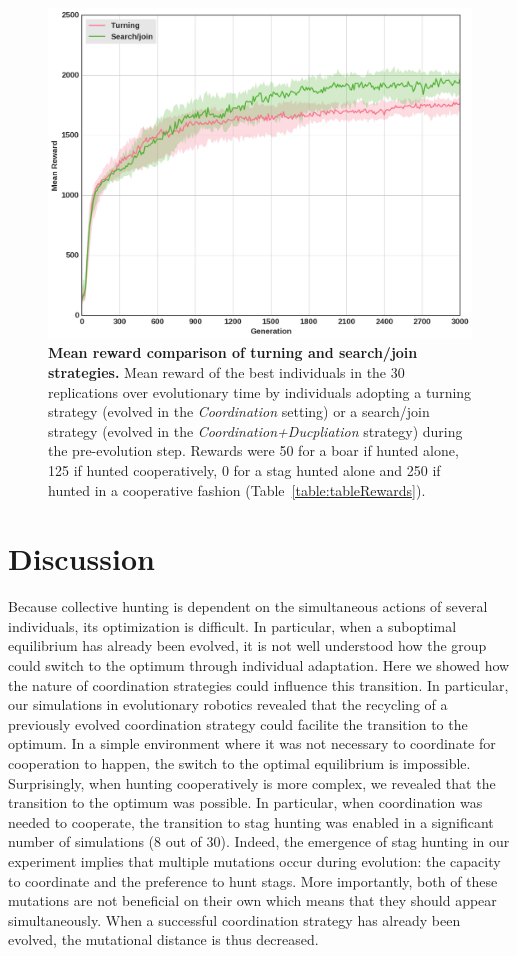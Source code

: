     \begin{figure}[h]
      \centering
        \includegraphics[width=0.7\linewidth]{fig/ArticleBio2/Fig8.png}
        \caption{\textbf{Mean reward comparison of turning and search/join strategies.}
        Mean reward of the best individuals in the $30$ replications over evolutionary time by individuals adopting a turning strategy (evolved in the \emph{Coordination} setting) or a search/join strategy (evolved in the \emph{Coordination+Ducpliation} strategy) during the pre-evolution step. Rewards were 50 for a boar if hunted alone, 125 if hunted cooperatively, 0 for a stag hunted alone and 250 if hunted in a cooperative fashion (Table~\ref{table:tableRewards}).}
      \label{fig:fitnessRecyclingComNN}
    \end{figure}  




\section{Discussion}
  Because collective hunting is dependent on the simultaneous actions of several individuals, its optimization is difficult. In particular, when a suboptimal equilibrium has already been evolved, it is not well understood how the group could switch to the optimum through individual adaptation. Here we showed how the nature of coordination strategies could influence this transition. In particular, our simulations in evolutionary robotics revealed that the recycling of a previously evolved coordination strategy could facilite the transition to the optimum. In a simple environment where it was not necessary to coordinate for cooperation to happen, the switch to the optimal equilibrium is impossible. Surprisingly, when hunting cooperatively is more complex, we revealed that the transition to the optimum was possible. In particular, when coordination was needed to cooperate, the transition to stag hunting was enabled in a significant number of simulations ($8$ out of $30$). Indeed, the emergence of stag hunting in our experiment implies that multiple mutations occur during evolution: the capacity to coordinate and the preference to hunt stags. More importantly, both of these mutations are not beneficial on their own which means that they should appear simultaneously. When a successful coordination strategy has already been evolved, the mutational distance is thus decreased. 

